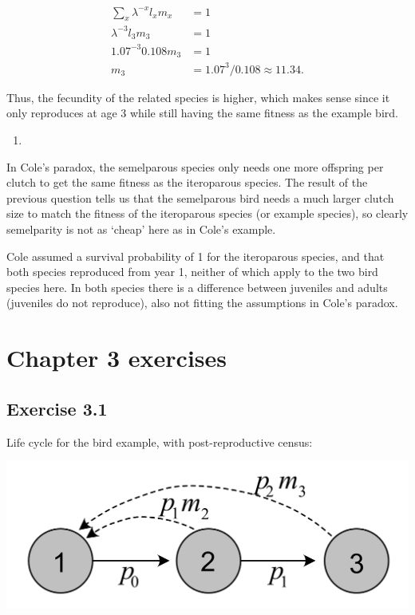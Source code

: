 \documentclass[
]{book}
\providecommand{\tightlist}{%
  \setlength{\itemsep}{0pt}\setlength{\parskip}{0pt}}
\begin{document}
\begin{align*}
\sum_x \lambda^{-x}l_xm_x&=1\\
\lambda^{-3}l_3m_3&=1\\
1.07^{-3}0.108m_3&=1\\
m_3&=1.07^{3}/0.108 \approx 11.34.
\end{align*}

Thus, the fecundity of the related species is higher, which makes sense since it only reproduces at age 3 while still having the same fitness as the example bird.

\begin{enumerate}
\def\labelenumi{\arabic{enumi}.}
\setcounter{enumi}{3}
\tightlist
\item
\end{enumerate}

In Cole's paradox, the semelparous species only needs one more offspring per clutch to get the same fitness as the iteroparous species. The result of the previous question tells us that the semelparous bird needs a much larger clutch size to match the fitness of the iteroparous species (or example species), so clearly semelparity is not as `cheap' here as in Cole's example.

Cole assumed a survival probability of 1 for the iteroparous species, and that both species reproduced from year 1, neither of which apply to the two bird species here. In both species there is a difference between juveniles and adults (juveniles do not reproduce), also not fitting the assumptions in Cole's paradox.

\hypertarget{chapter-3-exercises}{%
\section{Chapter 3 exercises}\label{chapter-3-exercises}}

\hypertarget{exercise-3.1-1}{%
\subsection*{Exercise 3.1}\label{exercise-3.1-1}}

Life cycle for the bird example, with post-reproductive census:

\includegraphics[width=0.6\linewidth]{LifeCycleAgePost}
\end{document}
